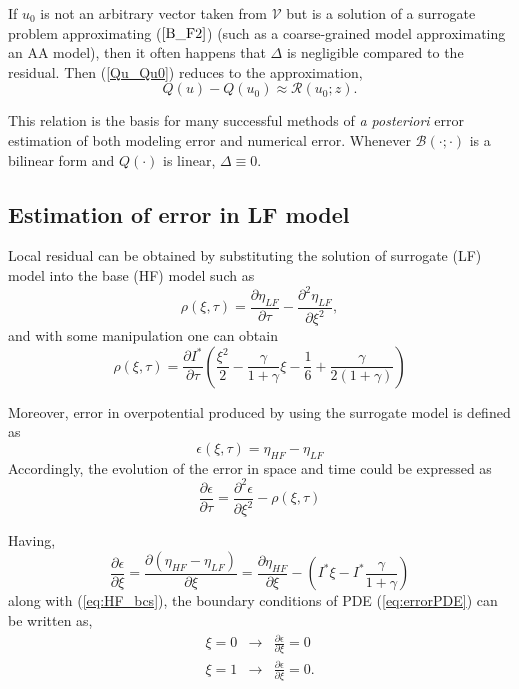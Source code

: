 \documentclass[]{article}
\begin{document}
If $u_0$ is not an arbitrary vector taken from $\mathcal{V}$ but is a solution of a surrogate problem approximating ($\ref{B_F2}$)
(such as a coarse-grained model approximating an AA model), then it often happens that $\Delta$ is negligible compared to the residual. Then (\ref{Qu_Qu0}) reduces to the approximation,
%
\begin{equation}\label{Qu_Qu0_noreminder}
Q(u) - Q(u_0) \approx \mathcal{R}(u_0;z).
\end{equation}
 
This relation is the basis for many successful methods of \textit{a posteriori} error estimation of both modeling error and numerical error. Whenever $\mathcal{B}(\cdot;\cdot)$ is a bilinear form and $Q(\cdot)$ is linear, $\Delta \equiv 0$.

\subsection{Estimation of error in LF model }
Local residual can be obtained by substituting the solution of surrogate (LF) model into the base (HF) model such as
%
\begin{equation}
\rho(\xi, \tau) = \frac{\partial{\eta_{LF}}}{\partial\tau} - \frac{\partial^2{\eta_{LF}}}{\partial\xi^2},
\end{equation}
%
and with some manipulation one can obtain
%
\begin{equation}\label{eq:residual}
\rho(\xi, \tau) = \frac{\partial I^*}{\partial\tau} \left(
\frac{\xi^2}{2} - \frac{\gamma}{1+\gamma}\xi - \frac{1}{6} + \frac{\gamma}{2(1+\gamma)}
\right)
\end{equation}


Moreover, error in overpotential produced by using the surrogate model is defined as
%
\begin{equation}\label{eq:error}
\epsilon(\xi,\tau) = \eta_{HF} - \eta_{LF}
\end{equation}
%
Accordingly, the evolution of the error in space and time could be expressed as
%
\begin{equation}\label{eq:errorPDE}
\frac{\partial\epsilon}{\partial\tau} = \frac{\partial^2\epsilon}{\partial\xi^2} - \rho(\xi,\tau)
\end{equation}
%

Having, 
%
\begin{equation}
\frac{\partial\epsilon}{\partial\xi} = \frac{\partial(\eta_{HF}-\eta_{LF})}{\partial\xi}
 = \frac{\partial\eta_{HF}}{\partial\xi}-(I^*\xi-I^*\frac{\gamma}{1+\gamma})
\end{equation}
%
along with (\ref{eq:HF_bcs}), the boundary conditions of PDE (\ref{eq:errorPDE}) can be written as,
\begin{eqnarray}\label{eq:error_bcs}
\xi = 0 &\rightarrow& \frac{\partial\epsilon}{\partial\xi}= 0\\
\xi = 1 &\rightarrow& \frac{\partial\epsilon}{\partial\xi}= 0. \nonumber
\end{eqnarray}
\end{document}
